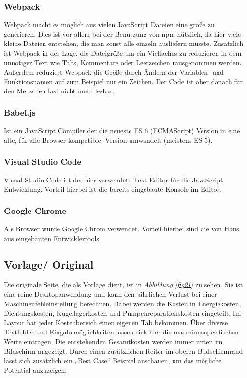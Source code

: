 \documentclass{article}
\begin{document}
		\subsubsection{Webpack}
		Webpack macht es möglich aus vielen JavaScript Dateien eine große zu generieren. Dies ist vor allem bei der Benutzung von npm nützlich, da hier viele kleine Dateien entstehen, die man sonst alle einzeln ausliefern müsste.
		Zusätzlich ist Webpack in der Lage, die Dateigröße um ein Vielfaches zu reduzieren in dem unnötiger Text wie Tabs, Kommentare oder Leerzeichen rausgenommen werden. Außerdem reduziert Webpack die Größe durch Ändern der Variablen- und Funktionsnamen auf zum Beispiel nur ein Zeichen. Der Code ist aber danach für den Menschen fast nicht mehr lesbar.
		\subsubsection{Babel.js}
		Ist ein JavaScript Compiler der die neueste ES 6 (ECMAScript) Version in eine alte, für alle Browser kompatible, Version umwandelt (meistens ES 5). 
		\subsubsection{Visual Studio Code}
		Visual Studio Code ist der hier verwendete Text Editor für die JavaScript Entwicklung. Vorteil hierbei ist die bereits eingebaute Konsole im Editor.
		\subsubsection{Google Chrome}
		Als Browser wurde Google Chrom verwendet. Vorteil hierbei sind die von Haus aus eingebauten Entwicklertools.
	\subsection{Vorlage/ Original}
	

	Die originale Seite, die als Vorlage dient, ist in \textit{Abbildung \ref{fig21}} zu sehen. Sie ist eine reine Desktopanwendung und kann den jährlichen Verlust bei einer Maschinenfehleinstellung berechnen. Dabei werden die Kosten in Energiekosten, Dichtungskosten, Kugellagerkosten und Pumpenreparationskosten eingeteilt. Im Layout hat jeder Kostenbereich einen eigenen Tab bekommen.
	Über diverse Textfelder und Eingabemöglichkeiten lassen sich hier die maschinenspezifischen Werte eintragen. Die entstehenden Gesamtkosten werden immer unten im Bildschirm angezeigt. Durch einen zusätzlichen Reiter im oberen Bildschirmrand lässt sich zusätzlich ein „Best Case“ Beispiel anschauen, um das mögliche Potential anzuzeigen.
	
\end{document}
